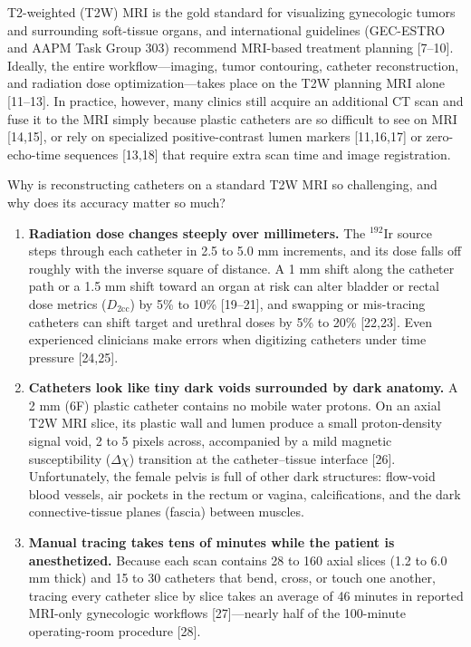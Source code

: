 \documentclass[
  11pt,
]{article}
\providecommand{\tightlist}{%
  \setlength{\itemsep}{0pt}\setlength{\parskip}{0pt}}
\begin{document}
T2-weighted (T2W) MRI is the gold standard for visualizing gynecologic
tumors and surrounding soft-tissue organs, and international guidelines
(GEC-ESTRO and AAPM Task Group 303) recommend MRI-based treatment
planning {[}7--10{]}. Ideally, the entire workflow---imaging, tumor
contouring, catheter reconstruction, and radiation dose
optimization---takes place on the T2W planning MRI alone {[}11--13{]}.
In practice, however, many clinics still acquire an additional CT scan
and fuse it to the MRI simply because plastic catheters are so difficult
to see on MRI {[}14,15{]}, or rely on specialized positive-contrast
lumen markers {[}11,16,17{]} or zero-echo-time sequences {[}13,18{]}
that require extra scan time and image registration.

Why is reconstructing catheters on a standard T2W MRI so challenging,
and why does its accuracy matter so much?

\begin{enumerate}
\def\labelenumi{\arabic{enumi}.}
\tightlist
\item
  \textbf{Radiation dose changes steeply over millimeters.} The
  \(^{192}\text{Ir}\) source steps through each catheter in 2.5 to 5.0
  mm increments, and its dose falls off roughly with the inverse square
  of distance. A 1 mm shift along the catheter path or a 1.5 mm shift
  toward an organ at risk can alter bladder or rectal dose metrics
  (\(D_{2\text{cc}}\)) by 5\% to 10\% {[}19--21{]}, and swapping or
  mis-tracing catheters can shift target and urethral doses by 5\% to
  20\% {[}22,23{]}. Even experienced clinicians make errors when
  digitizing catheters under time pressure {[}24,25{]}.
\item
  \textbf{Catheters look like tiny dark voids surrounded by dark
  anatomy.} A 2 mm (6F) plastic catheter contains no mobile water
  protons. On an axial T2W MRI slice, its plastic wall and lumen produce
  a small proton-density signal void, 2 to 5 pixels across, accompanied
  by a mild magnetic susceptibility (\(\Delta\chi\)) transition at the
  catheter--tissue interface {[}26{]}. Unfortunately, the female pelvis
  is full of other dark structures: flow-void blood vessels, air pockets
  in the rectum or vagina, calcifications, and the dark
  connective-tissue planes (fascia) between muscles.
\item
  \textbf{Manual tracing takes tens of minutes while the patient is
  anesthetized.} Because each scan contains 28 to 160 axial slices (1.2
  to 6.0 mm thick) and 15 to 30 catheters that bend, cross, or touch one
  another, tracing every catheter slice by slice takes an average of 46
  minutes in reported MRI-only gynecologic workflows {[}27{]}---nearly
  half of the 100-minute operating-room procedure {[}28{]}.
\end{enumerate}
\end{document}
